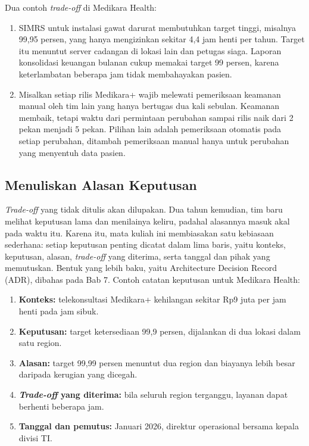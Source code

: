 Dua contoh \textit{trade-off} di Medikara Health:
\begin{enumerate}
  \item SIMRS untuk instalasi gawat darurat membutuhkan target tinggi, misalnya 99,95
        persen, yang hanya mengizinkan sekitar 4,4 jam henti per tahun. Target itu
        menuntut server cadangan di lokasi lain dan petugas siaga. Laporan konsolidasi
        keuangan bulanan cukup memakai target 99 persen, karena keterlambatan beberapa
        jam tidak membahayakan pasien.
  \item Misalkan setiap rilis Medikara+ wajib melewati pemeriksaan keamanan manual oleh
        tim lain yang hanya bertugas dua kali sebulan. Keamanan membaik, tetapi waktu
        dari permintaan perubahan sampai rilis naik dari 2 pekan menjadi 5 pekan.
        Pilihan lain adalah pemeriksaan otomatis pada setiap perubahan, ditambah
        pemeriksaan manual hanya untuk perubahan yang menyentuh data pasien.
\end{enumerate}

\subsection{Menuliskan Alasan Keputusan}

\textit{Trade-off} yang tidak ditulis akan dilupakan. Dua tahun kemudian, tim baru
melihat keputusan lama dan menilainya keliru, padahal alasannya masuk akal pada waktu
itu. Karena itu, mata kuliah ini membiasakan satu kebiasaan sederhana: setiap keputusan
penting dicatat dalam lima baris, yaitu konteks, keputusan, alasan, \textit{trade-off}
yang diterima, serta tanggal dan pihak yang memutuskan. Bentuk yang lebih baku, yaitu
Architecture Decision Record (ADR), dibahas pada Bab 7. Contoh catatan keputusan untuk
Medikara Health:
\begin{enumerate}
  \item \textbf{Konteks:} telekonsultasi Medikara+ kehilangan sekitar Rp9 juta per jam
        henti pada jam sibuk.
  \item \textbf{Keputusan:} target ketersediaan 99,9 persen, dijalankan di dua lokasi
        dalam satu region.
  \item \textbf{Alasan:} target 99,99 persen menuntut dua region dan biayanya lebih
        besar daripada kerugian yang dicegah.
  \item \textbf{\textit{Trade-off} yang diterima:} bila seluruh region terganggu,
        layanan dapat berhenti beberapa jam.
  \item \textbf{Tanggal dan pemutus:} Januari 2026, direktur operasional bersama kepala
        divisi TI.
\end{enumerate}

